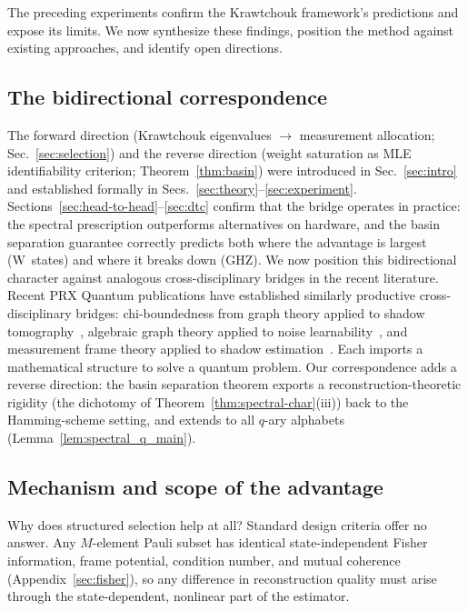\documentclass[twocolumn,prx,aps,superscriptaddress,longbibliography,floatfix]{revtex4-2}
\begin{document}
The preceding experiments confirm the Krawtchouk framework's
predictions and expose its limits.
We now synthesize these findings, position the method against
existing approaches, and identify open directions.

\subsection{The bidirectional correspondence}
\label{sec:bidirectional}

The forward direction (Krawtchouk eigenvalues $\to$ measurement
allocation; Sec.~\ref{sec:selection}) and the reverse direction
(weight saturation as MLE identifiability criterion;
Theorem~\ref{thm:basin}) were introduced in Sec.~\ref{sec:intro}
and established formally in Secs.~\ref{sec:theory}--\ref{sec:experiment}.
Sections~\ref{sec:head-to-head}--\ref{sec:dtc} confirm that the
bridge operates in practice: the spectral prescription outperforms
alternatives on hardware, and the basin separation guarantee
correctly predicts both where the advantage is largest (W~states)
and where it breaks down (GHZ).
We now position this bidirectional character against analogous
cross-disciplinary bridges in the recent literature.
Recent PRX Quantum publications have established similarly productive
cross-disciplinary bridges: chi-boundedness from graph theory applied
to shadow tomography~\cite{King2025}, algebraic graph theory applied
to noise learnability~\cite{ChenFlammia2026}, and measurement frame
theory applied to shadow estimation~\cite{Innocenti2023}.
Each imports a mathematical structure to solve a quantum problem.
Our correspondence adds a reverse direction: the basin
separation theorem exports a reconstruction-theoretic rigidity
(the dichotomy of Theorem~\ref{thm:spectral-char}(iii))
back to the Hamming-scheme setting, and extends to all $q$-ary
alphabets (Lemma~\ref{lem:spectral_q_main}).

\subsection{Mechanism and scope of the advantage}

Why does structured selection help at all?  Standard design criteria
offer no answer.  Any $M$-element Pauli subset has identical
state-independent Fisher information, frame potential, condition
number, and mutual coherence (Appendix~\ref{sec:fisher}), so
any difference in reconstruction quality must arise through the
state-dependent, nonlinear part of the estimator.
\end{document}
